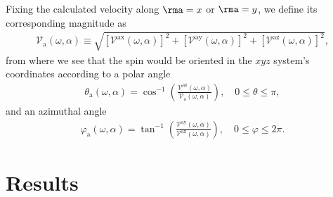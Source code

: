\documentclass[floatfix,prb,aps,superscriptaddress,showpacs,11pt,preprint,letterpaper]{revtex4}
\begin{document}
Fixing the calculated velocity along $\rma=x$ or $\rma=y$,
we define its corresponding magnitude as
\begin{align}
\mathcal{V}_{\mathrm{a}}(\omega,\alpha) \equiv 
\sqrt { 
[\mathcal{V}^{\mathrm{ax}}(\omega,\alpha)]^{2} +
[\mathcal{V}^{\mathrm{ay}}(\omega,\alpha)]^{2} +
[\mathcal{V}^{\mathrm{az}}(\omega,\alpha)]^{2} 
},
\label{eq:vv-mag}
\end{align}
from where we see that the spin would be oriented
in the $xyz$ system's coordinates
according to a polar angle
\begin{align}
\theta_{\mathrm{a}}  (\omega,\alpha)
= 
\cos^{-1} \left( \frac{\mathcal{V}^{\mathrm{az}}(\omega,\alpha)}
{\mathcal{V}_{\mathrm{a}}(\omega,\alpha)} \right),
 \quad 0 \leq \theta \leq \pi, 
\label{eq:polar-ang}
\end{align}
and an azimuthal angle
\begin{align}
\varphi_{\mathrm{a}} (\omega,\alpha)
=
\tan^{-1} \left( \frac{\mathcal{V}^{\mathrm{ay}}(\omega,\alpha)}
{\mathcal{V}^{\mathrm{ax}}(\omega,\alpha)} \right),
\quad 0 \leq \varphi \leq 2\pi.
\label{eq:azimuthal-ang} 
\end{align} 



\section{Results} %
\label{sec:results}
\end{document}
